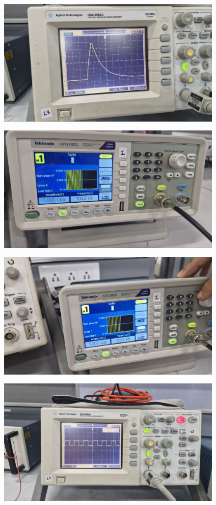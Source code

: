 \documentclass[a4paper,12pt]{article}
\begin{document}
\begin{figure}[h!]
   \centering
   \includegraphics[width=0.7\linewidth]{fig/Figure_8.jpg}
\end{figure}\begin{figure}[h!]
   \centering
   \includegraphics[width=0.7\linewidth]{fig/Figure_9.jpg}
\end{figure}
\begin{figure}[h!]
   \centering
   \includegraphics[width=0.7\linewidth]{fig/Figure_10.jpg}
\end{figure}
\begin{figure}[h!]
   \centering
   \includegraphics[width=0.7\linewidth]{fig/Figure_11.jpg}
\end{figure}
\end{document}
